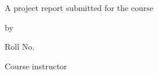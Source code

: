 \begin{titlepage}
\centering
\vspace*{1.5cm}
{\huge\bfseries \reporttitle\par}
\vspace{2.2cm}
{\large A project report submitted for the course\par}
\vspace{0.3cm}
{\large\bfseries \course\par}
\vspace{2.2cm}
{\large by\par}
\vspace{0.3cm}
{\Large\bfseries \studentname\par}
\vspace{0.2cm}
{\large Roll No.\ \rollno\par}
\vspace{0.2cm}
{\large \programme\par}
\vspace{1.6cm}
{\large Course instructor\par}
\vspace{0.3cm}
{\Large \instructor\par}
\vfill
{\large \department\par}
\vspace{0.2cm}
{\large\bfseries \institute\par}
\vspace{0.4cm}
{\large \reportdate\par}
\end{titlepage}
